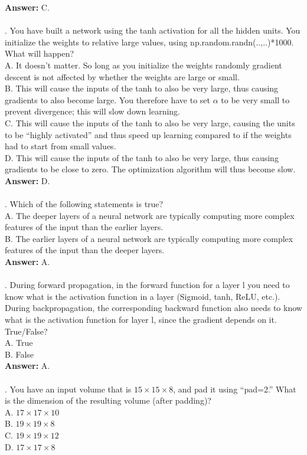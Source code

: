 \documentclass{article}
\begin{document}
\textbf{Answer: }C.
~\\
~\\
. You have built a network using the tanh activation for all the hidden units. You initialize the weights to relative large values, using np.random.randn(..,..)*1000. What will happen?  \\
    A. It doesn’t matter. So long as you initialize the weights randomly gradient descent is not affected by whether the weights are large or small.\\
    B. This will cause the inputs of the tanh to also be very large, thus causing gradients to also become large. You therefore have to set $\alpha$ to be very small to prevent divergence; this will slow down learning.\\
    C. This will cause the inputs of the tanh to also be very large, causing the units to be “highly activated” and thus speed up learning compared to if the weights had to start from small values. \\
    D. This will cause the inputs of the tanh to also be very large, thus causing gradients to be close to zero. The optimization algorithm will thus become slow. \\

\textbf{Answer: }D.
~\\
~\\
. Which of the following statements is true? \\
    A. The deeper layers of a neural network are typically computing more complex features of the input than the earlier layers. \\
    B. The earlier layers of a neural network are typically computing more complex features of the input than the deeper layers. \\
    
\textbf{Answer: }A.
~\\
~\\
. During forward propagation, in the forward function for a layer l you need to know what is the activation function in a layer (Sigmoid, tanh, ReLU, etc.). During backpropagation, the corresponding backward function also needs to know what is the activation function for layer l, since the gradient depends on it. True/False? \\
    A. True \\
    B. False \\

\textbf{Answer: }A.
~\\
~\\
. You have an input volume that is $15\times15\times8$, and pad it using “pad=2.” What is the dimension of the resulting volume (after padding)?  \\
    A. $17\times17\times10$ \\
    B. $19\times19\times8$ \\
    C. $19\times19\times12$ \\
    D. $17\times17\times8$ \\
\end{document}
